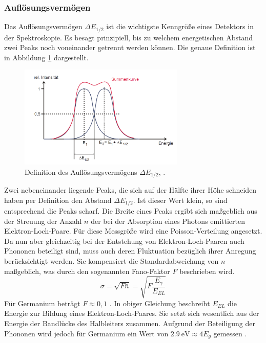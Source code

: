 \subsubsection{Auflösungsvermögen}
Das Auflösungsvermögen $\Delta E_{1/2}$ ist die wichtigste Kenngröße eines Detektors in der Spektroskopie. Es besagt prinzipiell, bis zu welchem energetischen Abstand zwei Peaks noch voneinander getrennt werden können. Die genaue Definition ist in Abbildung \ref{fig:aufl} dargestellt.
\begin{figure}
  \centering
  \includegraphics[width=0.7\textwidth]{ressources/aufl.png}
  \caption{Definition des Auflösungsvermögens $\Delta E_{1/2}$, \cite{skript}.}
  \label{fig:aufl}
\end{figure}
Zwei nebeneinander liegende Peaks, die sich auf der Hälfte ihrer Höhe schneiden haben per Definition den Abstand $\Delta E_{1/2}$. Ist dieser Wert klein, so sind entsprechend die Peaks scharf. Die Breite eines Peaks ergibt sich maßgeblich aus der Streuung der Anzahl $n$ der bei der Absorption eines Photons emittierten Elektron-Loch-Paare. Für diese Messgröße wird eine Poisson-Verteilung angesetzt. Da nun aber gleichzeitig bei der Entstehung von Elektron-Loch-Paaren auch Phononen beteiligt sind, muss auch deren Fluktuation bezüglich ihrer Anregung berücksichtigt werden. Sie kompensiert die Standardabweichung von $n$ maßgeblich, was durch den sogenannten Fano-Faktor $F$ beschrieben wird.
\begin{equation}
  \sigma = \sqrt{F\bar{n}} = \sqrt{F\frac{E_\gamma}{E_{EL}}}
  \label{eq:fano_halbwertsbreite}
\end{equation}
Für Germanium beträgt $F\approx0,1$ \cite{skript}. In obiger Gleichung beschreibt $E_{EL}$ die Energie zur Bildung eines Elektron-Loch-Paares. Sie setzt sich wesentlich aus der Energie der Bandlücke des Halbleiters zusammen. Aufgrund der Beteiligung der Phononen wird jedoch für Germanium ein Wert von $\SI{2,9}{\electronvolt} \approx 4E_g$ gemessen \cite{skript}.\\
